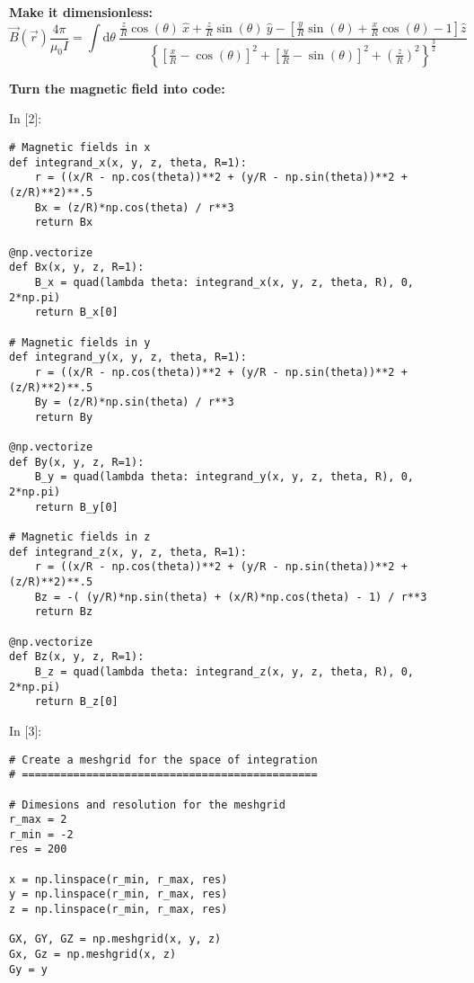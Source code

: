\documentclass[11pt]{article}
\newif\ifcode
\newif\ifleftmargins
\newlength{\promptlength}
\newcommand{\prompt}[3]{
        \needspace{1.1cm}
        \settowidth{\promptlength}{ #1 [#3] }
        \ifleftmargins\hspace{-\promptlength}\hspace{-5pt}\fi
        {\color{#2}#1 [#3]:}
        \ifleftmargins\vspace{-2.7ex}\fi
    }
\begin{document}
\textbf{Make it dimensionless:}
\[\vec{B}(\vec{r}) \frac{4 \pi}{\mu_0 I}  = \int \text{d}\theta \ \frac{\frac{z}{R}\cos(\theta) \ \hat{x} + \frac{z}{R}\sin(\theta) \ \hat{y} - \left[\frac{y}{R}\sin(\theta) + \frac{x}{R}\cos(\theta) - 1\right] \hat{z}}{\left\{ \left[\frac{x}{R}-\cos(\theta)\right]^2 + \left[\frac{y}{R}-\sin(\theta)\right]^2 + \left(\frac{z}{R}\right)^2 \right\}^\frac{3}{2} }\]

    \textbf{Turn the magnetic field into code:}

    
\prompt{In}{incolor}{2}
\codetrue
\begin{tcolorbox}[breakable, size=fbox, boxrule=1pt, pad at break*=1mm, colback=cellbackground, colframe=cellborder]
\begin{verbatim}
# Magnetic fields in x
def integrand_x(x, y, z, theta, R=1):
    r = ((x/R - np.cos(theta))**2 + (y/R - np.sin(theta))**2 + (z/R)**2)**.5
    Bx = (z/R)*np.cos(theta) / r**3
    return Bx

@np.vectorize
def Bx(x, y, z, R=1):
    B_x = quad(lambda theta: integrand_x(x, y, z, theta, R), 0, 2*np.pi)
    return B_x[0]

# Magnetic fields in y
def integrand_y(x, y, z, theta, R=1):
    r = ((x/R - np.cos(theta))**2 + (y/R - np.sin(theta))**2 + (z/R)**2)**.5
    By = (z/R)*np.sin(theta) / r**3
    return By

@np.vectorize
def By(x, y, z, R=1):
    B_y = quad(lambda theta: integrand_y(x, y, z, theta, R), 0, 2*np.pi)
    return B_y[0]

# Magnetic fields in z
def integrand_z(x, y, z, theta, R=1):
    r = ((x/R - np.cos(theta))**2 + (y/R - np.sin(theta))**2 + (z/R)**2)**.5
    Bz = -( (y/R)*np.sin(theta) + (x/R)*np.cos(theta) - 1) / r**3
    return Bz

@np.vectorize
def Bz(x, y, z, R=1):
    B_z = quad(lambda theta: integrand_z(x, y, z, theta, R), 0, 2*np.pi)
    return B_z[0]
\end{verbatim}
\end{tcolorbox}
\codefalse

    
\prompt{In}{incolor}{3}
\codetrue
\begin{tcolorbox}[breakable, size=fbox, boxrule=1pt, pad at break*=1mm, colback=cellbackground, colframe=cellborder]
\begin{verbatim}
# Create a meshgrid for the space of integration
# ==============================================

# Dimesions and resolution for the meshgrid 
r_max = 2
r_min = -2
res = 200

x = np.linspace(r_min, r_max, res)
y = np.linspace(r_min, r_max, res)
z = np.linspace(r_min, r_max, res)

GX, GY, GZ = np.meshgrid(x, y, z)
Gx, Gz = np.meshgrid(x, z)
Gy = y
\end{verbatim}
\end{tcolorbox}
\codefalse
\end{document}

